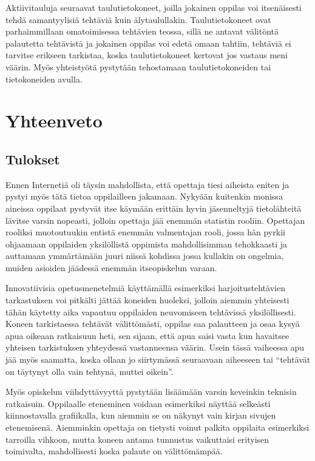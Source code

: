 \documentclass[utf8,bachelor]{gradu3}
\begin{document}
Aktiivitauluja seuraavat taulutietokoneet, joilla jokainen oppilas voi itsenäisesti tehdä samantyylisiä tehtäviä kuin älytaulullakin. Taulutietokoneet ovat parhaimmillaan omatoimisessa tehtävien teossa, sillä ne antavat välitöntä palautetta tehtävistä ja jokainen oppilas voi edetä omaan tahtiin, tehtäviä ei tarvitse erikseen tarkistaa, koska taulutietokoneet kertovat jos vastaus meni väärin. Myös yhteistyötä pystytään tehostamaan taulutietokoneiden tai tietokoneiden avulla.


\chapter{Yhteenveto}

\section{Tulokset}
Ennen Internetiä oli täysin mahdollista, että opettaja tiesi aiheista eniten ja pystyi myös tätä tietoa oppilailleen jakamaan. Nykyään kuitenkin monissa aineissa oppilaat pystyvät itse käymään erittäin hyvin jäsenneltyjä tietolähteitä lävitse varsin nopeasti, jolloin opettaja jää enemmän statistin rooliin. Opettajan rooliksi muotoutuukin entistä enemmän valmentajan rooli, jossa hän pyrkii ohjaamaan oppilaiden yksilöllistä oppimista mahdollisimman tehokkaasti ja auttamaan ymmärtämään juuri niissä kohdissa jossa kullakin on ongelmia, muiden asioiden jäädessä enemmän itseopiskelun varaan.

Innovatiivisia opetusmenetelmiä käyttämällä esimerkiksi harjoitustehtävien tarkastuksen voi pitkälti jättää koneiden huoleksi, jolloin aiemmin yhteisesti tähän käytetty aika vapautuu oppilaiden neuvomiseen tehtävissä yksilöllisesti. Koneen tarkistaessa tehtävät välittömästi, oppilas saa palautteen ja osaa kysyä apua oikeaan ratkaisuun heti, sen sijaan, että apua saisi vasta kun havaitsee yhteisen tarkistuksen yhteydessä vastanneensa väärin. Usein tässä vaiheessa apu jää myös saamatta, koska ollaan jo siirtymässä seuraavaan aiheeseen tai “tehtävät on täytynyt olla vain tehtynä, muttei oikein”.

Myös opiskelun viihdyttävyyttä pystytään lisäämään varsin keveinkin teknisin ratkaisuin. Oppilaalle eteneminen voidaan esimerkiksi näyttää selkeästi kiinnostavalla grafiikalla, kun aiemmin se on näkynyt vain kirjan sivujen etenemisenä. Aiemminkin opettaja on tietysti voinut palkita oppilaita esimerkiksi tarroilla vihkoon, mutta koneen antama tunnustus vaikuttaisi erityisen toimivalta, mahdollisesti koska palaute on välittömämpää.
\end{document}
